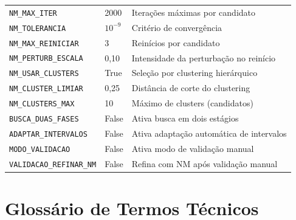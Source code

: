 \documentclass[12pt,a4paper]{report}
\newcommand{\code}[1]{\texttt{#1}}
\begin{document}
\begin{longtable}{lll}
  \code{NM\_MAX\_ITER}       & 2000 & Iterações máximas por candidato \\
  \code{NM\_TOLERANCIA}      & $10^{-9}$ & Critério de convergência \\
  \code{NM\_MAX\_REINICIAR}  & 3    & Reinícios por candidato \\
  \code{NM\_PERTURB\_ESCALA} & 0,10 & Intensidade da perturbação no reinício \\
  \code{NM\_USAR\_CLUSTERS}  & True & Seleção por clustering hierárquico \\
  \code{NM\_CLUSTER\_LIMIAR} & 0,25 & Distância de corte do clustering \\
  \code{NM\_CLUSTERS\_MAX}   & 10   & Máximo de clusters (candidatos) \\
  \code{BUSCA\_DUAS\_FASES}  & False & Ativa busca em dois estágios \\
  \code{ADAPTAR\_INTERVALOS} & False & Ativa adaptação automática de intervalos \\
  \code{MODO\_VALIDACAO}     & False & Ativa modo de validação manual \\
  \code{VALIDACAO\_REFINAR\_NM} & False & Refina com NM após validação manual \\
\end{longtable}


\chapter{Glossário de Termos Técnicos}
\label{ap:glossario}
\end{document}
